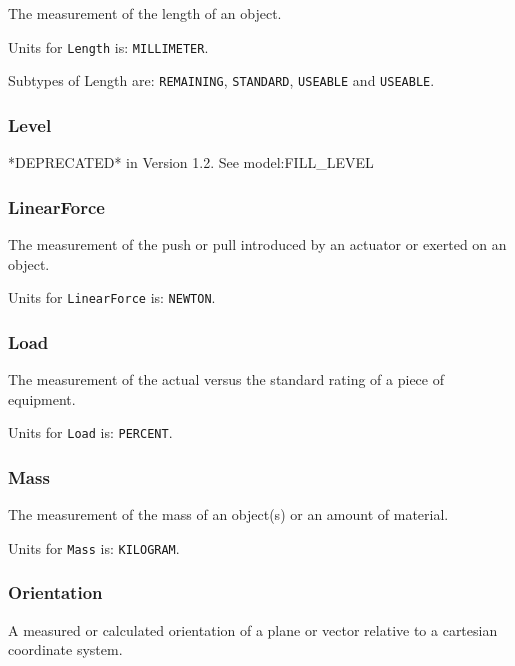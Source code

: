 The measurement of the length of an object.


Units for \texttt{Length} is: \texttt{MILLIMETER}.


Subtypes of Length are: \texttt{REMAINING}, \texttt{STANDARD}, \texttt{USEABLE} and \texttt{USEABLE}. 
\FloatBarrier

\subsubsection{Level}
  \label{sec:Level}


*DEPRECATED* in Version 1.2.  See {model:FILL_LEVEL}

\FloatBarrier

\subsubsection{LinearForce}
  \label{sec:LinearForce}


The measurement of the push or pull introduced by an actuator or exerted on an object.


Units for \texttt{LinearForce} is: \texttt{NEWTON}.

\FloatBarrier

\subsubsection{Load}
  \label{sec:Load}


The measurement of the actual versus the standard rating of a piece of equipment.


Units for \texttt{Load} is: \texttt{PERCENT}.

\FloatBarrier

\subsubsection{Mass}
  \label{sec:Mass}


The measurement of the mass of an object(s) or an amount of material.


Units for \texttt{Mass} is: \texttt{KILOGRAM}.

\FloatBarrier

\subsubsection{Orientation}
  \label{sec:Orientation}


A measured or calculated orientation of a plane or vector relative to a cartesian coordinate system.


